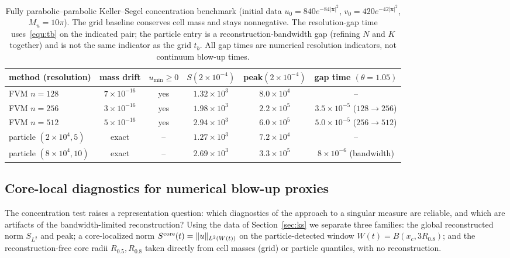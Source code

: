 \documentclass[a4paper,fleqn]{cas-sc}
\theoremstyle{definition}
\theoremstyle{remark}
\begin{document}
\begin{table}[t]
\centering
\caption{Fully parabolic--parabolic Keller--Segel concentration benchmark (initial data $u_0=840e^{-84|\mathbf x|^2}$, $v_0=420e^{-42|\mathbf x|^2}$, $M_u=10\pi$).  The grid baseline conserves cell mass and stays nonnegative.  The resolution-gap time uses~\eqref{equ:tb} on the indicated pair; the particle entry is a reconstruction-bandwidth gap (refining $N$ and $K$ together) and is not the same indicator as the grid $t_b$.  All gap times are numerical resolution indicators, not continuum blow-up times.}
\label{tab:ks_pp}
\begin{tabular}{l c c c c c}
\toprule
method (resolution) & mass drift & $u_{\min}\!\ge\!0$ & $S(2{\times}10^{-4})$ & peak$(2{\times}10^{-4})$ & gap time $(\theta{=}1.05)$ \\
\midrule
FVM $n=128$ & $7{\times}10^{-16}$ & yes & $1.32{\times}10^3$ & $8.0{\times}10^4$ & -- \\
FVM $n=256$ & $3{\times}10^{-16}$ & yes & $1.98{\times}10^3$ & $2.2{\times}10^5$ & $3.5{\times}10^{-5}$ ($128{\to}256$) \\
FVM $n=512$ & $5{\times}10^{-16}$ & yes & $2.94{\times}10^3$ & $6.0{\times}10^5$ & $5.0{\times}10^{-5}$ ($256{\to}512$) \\
particle $(2{\times}10^4,5)$ & exact & -- & $1.27{\times}10^3$ & $7.2{\times}10^4$ & -- \\
particle $(8{\times}10^4,10)$ & exact & -- & $2.69{\times}10^3$ & $3.3{\times}10^5$ & $8{\times}10^{-6}$ (bandwidth) \\
\bottomrule
\end{tabular}
\end{table}

\subsection{Core-local diagnostics for numerical blow-up proxies}
\label{sec:ks_core}

The concentration test raises a representation question: which diagnostics of the approach to a singular measure are reliable, and which are artifacts of the bandwidth-limited reconstruction?  Using the data of Section~\ref{sec:ks} we separate three families: the global reconstructed norm $S_{L^2}$ and peak; a core-localized norm $S^{\rm core}(t)=\|u\|_{L^2(W(t))}$ on the particle-detected window $W(t)=B(x_c,3R_{0.8})$; and the reconstruction-free core radii $R_{0.5},R_{0.8}$ taken directly from cell masses (grid) or particle quantiles, with no reconstruction.
\end{document}
